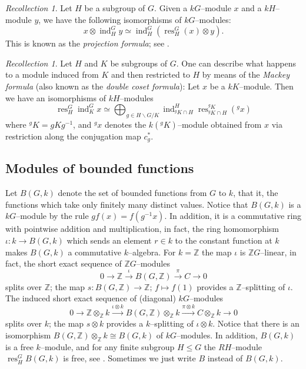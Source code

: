 \documentclass{amsart}
\newcommand{\res}{\operatorname{res}\nolimits}
\newcommand{\ind}{\operatorname{ind}\nolimits}
\numberwithin{equation}{section}%
\theoremstyle{remark}
\newtheorem{recollection}[equation]{Recollection}
\begin{document}
\begin{recollection}
 Let $H$ be a subgroup of $G$. Given a $kG$--module $x$ and a  $kH$--module $y$, we have the following isomorphisms of $kG$--modules: 
 \[
 x\otimes \ind_H^G y\simeq \ind_H^G(\res^G_H (x)\otimes y).
 \]
 This is known as the  \textit{projection formula}; see \cite[Proposition 3.3.3]{Ben98}.
\end{recollection}

\begin{recollection}
  Let  $H$ and $K$ be subgroups of $G$. One can describe what happens to a module induced from $K$ and then restricted to $H$ by means of the \textit{Mackey formula} (also known as the \textit{double coset formula}): Let $x$ be a $kK$--module. Then we have an isomorphisms of $kH$--modules
  \[
   \res^G_H\ind_K^Gx\simeq \bigoplus_{g\in H\backslash G/K} \ind_{{}^g\!K\cap H}^H \res^{{}^g\!K}_{{}^g\!K\cap H}({}^g\!x)
  \]
  where ${}^g\!K=gKg^{-1}$, and ${}^g\!x$ denotes the $k({}^g\!K)$--module obtained from $x$ via  restriction along the conjugation map $c^\ast_g$. 
\end{recollection}

\subsection{Modules of bounded functions}
Let $B(G,k)$ denote the set of bounded functions from $G$ to $k$, that it, the functions which take only finitely many distinct values. Notice that $B(G,k)$ is a $kG$--module by the rule $gf(x)=f(g^{-1}x)$. In addition, it is a commutative ring with pointwise addition and multiplication, in fact, the ring homomorphism $\iota\colon k\rightarrow B(G,k)$ which sends an element $r\in k$ to the constant function at $k$ makes $B(G,k)$ a commutative $k$--algebra. For $k=\mathbb{Z}$ the map $\iota$ is $\mathbb{Z}G$--linear, in fact, the short exact sequence of $\mathbb{Z}G$--modules
\begin{equation}
0\rightarrow \mathbb{Z}\xrightarrow{\iota} B(G,\mathbb{Z}) \xrightarrow{\pi} C\rightarrow 0 \nonumber
\end{equation}
splits over $\mathbb{Z}$; the map $s\colon B(G,\mathbb{Z})\rightarrow \mathbb{Z};\, f\mapsto f(1)$ provides a $\mathbb{Z}$--splitting of $\iota$. The induced short exact sequence of (diagonal) $kG$--modules
\begin{equation}
\label{eq:B_sequence}
0\rightarrow \mathbb{Z}\otimes_{\mathbb{Z}}k \xrightarrow{\iota\otimes k} B(G,\mathbb{Z})\otimes_{\mathbb{Z}}k \xrightarrow{\pi\otimes k} C\otimes_{\mathbb{Z}}k\rightarrow 0
\end{equation}
splits over $k$; the map $s\otimes k$ provides a $k$--splitting of $\iota\otimes k$.
Notice that there is an isomorphism $B(G,\mathbb{Z})\otimes_{\mathbb{Z}}k\cong B(G,k)$ of $kG$--modules.
In addition, $B(G,k)$ is a free $k$--module, and for any finite subgroup $H\leqslant  G$ the $RH$--module $\res_H^GB(G,k)$ is free, see \cite[Lemma~3.4]{benson97}. Sometimes we just write $B$ instead of $B(G,k)$. 
\end{document}
